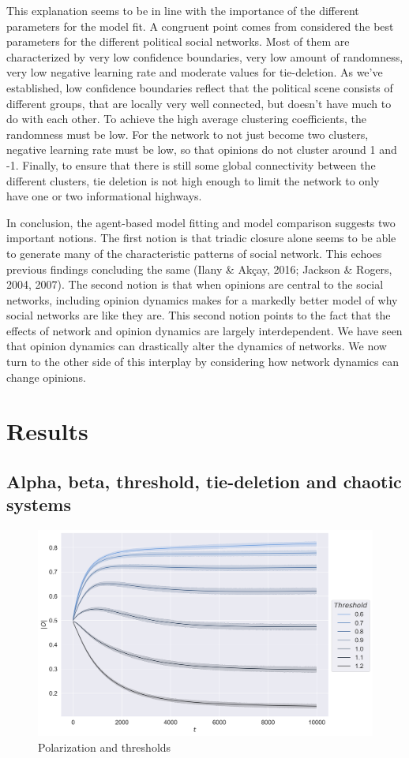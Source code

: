 \documentclass{article}
\begin{document}
This explanation seems to be in line with the importance of the different parameters for the model fit. A congruent point comes from considered the best parameters for the different political social networks. Most of them are characterized by very low confidence boundaries, very low amount of randomness, very low negative learning rate and moderate values for tie-deletion. As we’ve established, low confidence boundaries reflect that the political scene consists of different groups, that are locally very well connected, but doesn’t have much to do with each other. To achieve the high average clustering coefficients, the randomness must be low. For the network to not just become two clusters, negative learning rate must be low, so that opinions do not cluster around 1 and -1. Finally, to ensure that there is still some global connectivity between the different clusters, tie deletion is not high enough to limit the network to only have one or two informational highways. 

In conclusion, the agent-based model fitting and model comparison suggests two important notions. The first notion is that triadic closure alone seems to be able to generate many of the characteristic patterns of social network. This echoes previous findings concluding the same (Ilany \& Akçay, 2016; Jackson \& Rogers, 2004, 2007). The second notion is that when opinions are central to the social networks, including opinion dynamics makes for a markedly better model of why social networks are like they are. 
This second notion points to the fact that the effects of network and opinion dynamics are largely interdependent. We have seen that opinion dynamics can drastically alter the dynamics of networks. We now turn to the other side of this interplay by considering how network dynamics can change opinions.

\section{Results}

\subsection{Alpha, beta, threshold, tie-deletion and chaotic systems}

\begin{figure}[H]
    \centering
    \includegraphics[width=.8\linewidth]{../plots/overall/Absolute_Opinion_Threshold.png}
  \caption{Polarization and thresholds}
  \label{fig:sfig1}
\end{figure}
\end{document}
